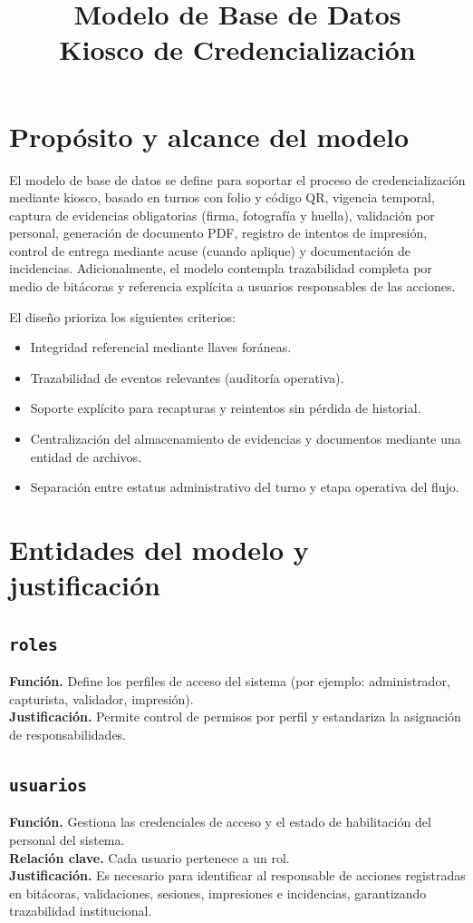 \documentclass[12pt,a4paper]{article}
\title{Modelo de Base de Datos\\Kiosco de Credencialización}
\author{}
\date{}
\begin{document}
\maketitle

\section{Propósito y alcance del modelo}

El modelo de base de datos se define para soportar el proceso de credencialización mediante kiosco, basado en turnos con folio y código QR, vigencia temporal, captura de evidencias obligatorias (firma, fotografía y huella), validación por personal, generación de documento PDF, registro de intentos de impresión, control de entrega mediante acuse (cuando aplique) y documentación de incidencias. Adicionalmente, el modelo contempla trazabilidad completa por medio de bitácoras y referencia explícita a usuarios responsables de las acciones.

El diseño prioriza los siguientes criterios:
\begin{itemize}
  \item Integridad referencial mediante llaves foráneas.
  \item Trazabilidad de eventos relevantes (auditoría operativa).
  \item Soporte explícito para recapturas y reintentos sin pérdida de historial.
  \item Centralización del almacenamiento de evidencias y documentos mediante una entidad de archivos.
  \item Separación entre estatus administrativo del turno y etapa operativa del flujo.
\end{itemize}

\section{Entidades del modelo y justificación}

\subsection{\texttt{roles}}
\textbf{Función.} Define los perfiles de acceso del sistema (por ejemplo: administrador, capturista, validador, impresión).\\
\textbf{Justificación.} Permite control de permisos por perfil y estandariza la asignación de responsabilidades.

\subsection{\texttt{usuarios}}
\textbf{Función.} Gestiona las credenciales de acceso y el estado de habilitación del personal del sistema.\\
\textbf{Relación clave.} Cada usuario pertenece a un rol.\\
\textbf{Justificación.} Es necesario para identificar al responsable de acciones registradas en bitácoras, validaciones, sesiones, impresiones e incidencias, garantizando trazabilidad institucional.
\end{document}

